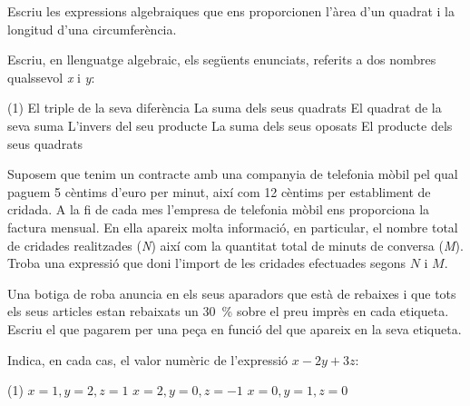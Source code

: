 \begin{mylist}



\exer  Escriu les expressions algebraiques que ens proporcionen l'àrea d'un quadrat i la longitud d'una circumferència.


\exer \spen  Escriu, en llenguatge algebraic, els següents enunciats, referits a dos nombres qualssevol \textit{x} i \textit{y}:
\begin{tasks}(1)
	\task  El triple de la seva diferència  \dotfill 
	\task  La suma dels seus quadrats   \dotfill
	\task  El quadrat de la seva suma  \dotfill
	\task  L'invers del seu producte  \dotfill 
	\task  La suma dels seus oposats  \dotfill 
	\task  El producte dels seus quadrats \dotfill
\end{tasks}


\exer  Suposem que tenim un contracte amb una companyia de telefonia mòbil pel qual paguem 5 cèntims d'euro per minut, així com 12 cèntims per establiment de cridada.  A la fi de cada mes l'empresa de telefonia mòbil ens proporciona la factura mensual. En ella apareix molta informació, en particular, el nombre total de cridades realitzades (\textit{N}) així com la quantitat total de minuts de conversa (\textit{M}). Troba una expressió que doni l'import de les cridades efectuades segons $N$ i $M$.

\redacta



\exer  Una botiga de roba anuncia en els seus aparadors que està de rebaixes i que tots els seus articles estan rebaixats un 30~\% sobre el preu imprès en cada etiqueta. Escriu el que pagarem per una peça en funció del que apareix en la seva etiqueta. 


\exer  \spen Indica, en cada cas, el valor numèric de l'expressió $x-2y+3z$:  
\begin{tasks}(1)
	\task   $x=1,y=2,z=1$    \quad {}
	\task   $x=2,y=0,z=-1$    
	\task   $x=0,y=1,z=0$    
\end{tasks}


\end{mylist}
